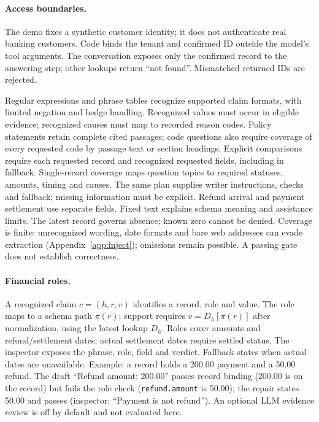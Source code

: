 \documentclass[11pt]{article}
\begin{document}
\paragraph{Access boundaries.} The demo fixes a synthetic customer identity; it does not
authenticate real banking customers. Code binds the tenant and confirmed ID outside the model's
tool arguments. The conversation exposes only the confirmed record to the answering step;
other lookups return ``not found''. Mismatched returned IDs are rejected.

Regular expressions and phrase tables recognize supported claim formats, with limited negation
and hedge handling. Recognized values must occur in eligible evidence; recognized causes must
map to recorded reason codes. Policy statements retain complete cited passages; code questions
also require coverage of every requested code by passage text or section headings. Explicit
comparisons require each requested record and recognized requested fields, including in fallback.
Single-record coverage maps question topics to required statuses, amounts, timing and causes.
The same plan supplies writer instructions, checks and fallback; missing information must be
explicit. Refund arrival and payment settlement use separate fields. Fixed text explains schema
meaning and assistance limits. The latest record governs absence; known zero cannot be denied.
Coverage is finite: unrecognized wording, date formats and bare web addresses can evade extraction
(Appendix~\ref{app:inject}); omissions remain possible. A passing gate does not establish correctness.

\paragraph{Financial roles.} A recognized claim $c=(h,r,v)$ identifies a record, role and value.
The role maps to a schema path $\pi(r)$; support requires $v=D_h[\pi(r)]$ after normalization,
using the latest lookup $D_h$. Roles cover amounts and refund/settlement dates; actual settlement
dates require settled status. The inspector exposes the phrase, role, field
and verdict. Fallback states when actual dates are unavailable.
Example: a record holds a 200.00 payment and a 50.00 refund. The draft ``Refund amount: 200.00''
passes record binding (200.00 is on the record) but fails the role check (\texttt{refund.amount} is
50.00); the repair states 50.00 and passes (inspector: ``Payment is not refund''). An optional LLM
evidence review is off by default and not evaluated here.
\end{document}
